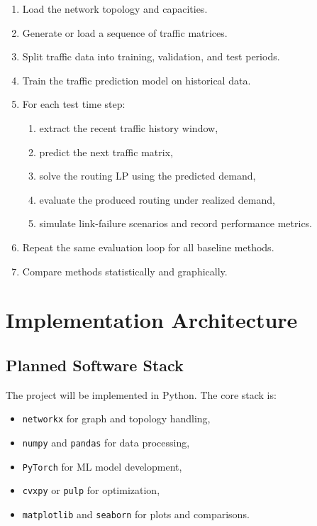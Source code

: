 \documentclass[11pt]{article}
\begin{document}
\begin{enumerate}
    \item Load the network topology and capacities.
    \item Generate or load a sequence of traffic matrices.
    \item Split traffic data into training, validation, and test periods.
    \item Train the traffic prediction model on historical data.
    \item For each test time step:
    \begin{enumerate}[label=\alph*.]
        \item extract the recent traffic history window,
        \item predict the next traffic matrix,
        \item solve the routing LP using the predicted demand,
        \item evaluate the produced routing under realized demand,
        \item simulate link-failure scenarios and record performance metrics.
    \end{enumerate}
    \item Repeat the same evaluation loop for all baseline methods.
    \item Compare methods statistically and graphically.
\end{enumerate}

\section{Implementation Architecture}
\subsection{Planned Software Stack}
The project will be implemented in Python. The core stack is:
\begin{itemize}
    \item \texttt{networkx} for graph and topology handling,
    \item \texttt{numpy} and \texttt{pandas} for data processing,
    \item \texttt{PyTorch} for ML model development,
    \item \texttt{cvxpy} or \texttt{pulp} for optimization,
    \item \texttt{matplotlib} and \texttt{seaborn} for plots and comparisons.
\end{itemize}
\end{document}
